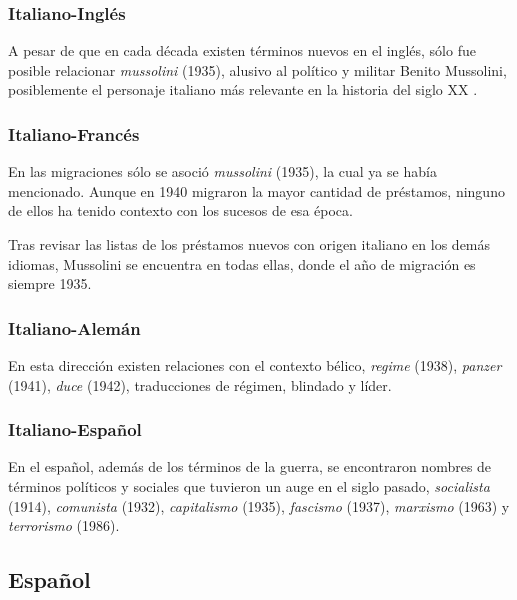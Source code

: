 \subsubsection*{Italiano-Inglés}%

A pesar de que en cada década existen términos nuevos en el inglés, sólo fue posible relacionar \textit{mussolini} (1935),  alusivo al político y militar Benito Mussolini, posiblemente el personaje italiano más relevante en la historia del siglo XX .

\subsubsection*{Italiano-Francés}%



En las migraciones sólo se asoció \textit{mussolini} (1935), la cual ya se había mencionado. Aunque en 1940 migraron la mayor cantidad de préstamos, ninguno de ellos ha tenido contexto con los sucesos de esa época. 

Tras revisar las listas de los préstamos nuevos con origen italiano  en los demás idiomas, Mussolini se encuentra en todas ellas, donde  el año de migración es siempre 1935.





\subsubsection*{Italiano-Alemán}%

En esta dirección existen relaciones con el contexto bélico,  \textit{regime} (1938), \textit{panzer} (1941), \textit{duce} (1942),  traducciones de régimen, blindado y líder.




\subsubsection*{Italiano-Español}%

En el español, además de los términos de la guerra, se encontraron nombres de términos políticos y sociales que tuvieron un auge en el siglo pasado,  \textit{socialista} (1914), \textit{comunista} (1932), \textit{capitalismo} (1935), \textit{fascismo} (1937),  \textit{marxismo} (1963) y \textit{terrorismo} (1986). 

\subsection{Español}%

